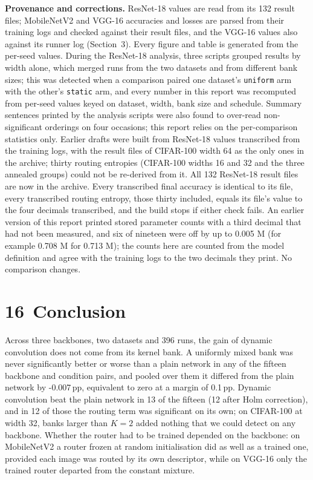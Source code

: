 \documentclass{article}
\begin{document}
\textbf{Provenance and corrections.}  ResNet-18 values are read from
its 132 result files; MobileNetV2 and VGG-16 accuracies and losses are
parsed from their training logs and checked against their result files,
and the VGG-16 values also against its runner log
(Section~3). Every figure and table is generated from the
per-seed values. During the ResNet-18 analysis, three scripts
grouped results by width alone, which merged runs from the two datasets and
from different bank sizes; this was detected when a comparison paired one
dataset's \texttt{uniform} arm with the other's \texttt{static} arm, and
every number in this report was recomputed from per-seed values keyed on
dataset, width, bank size and schedule. Summary sentences printed by the
analysis scripts were also found to over-read non-significant orderings on
four occasions; this report relies on the per-comparison statistics only.
Earlier drafts were built from ResNet-18 values transcribed from the
training logs, with the result files of CIFAR-100 width 64 as the only
ones in the archive; thirty routing entropies (CIFAR-100 widths 16 and 32
and the three annealed groups) could not be re-derived from it. All 132
ResNet-18 result files are now in the archive. Every transcribed final
accuracy is identical to its file, every transcribed routing entropy,
those thirty included, equals its file's value to the four decimals
transcribed, and the build stops if either check fails. An earlier version of this report printed stored
parameter counts with a third decimal that had not been measured, and six
of nineteen were off by up to 0.005 M (for example 0.708 M for
0.713 M); the counts here are counted from the model definition and
agree with the training logs to the two decimals they print. No comparison
changes.

\section*{16 Conclusion}

Across three backbones, two datasets and 396 runs, the gain of
dynamic convolution does not come from its kernel bank. A uniformly mixed
bank was never significantly better or worse than a plain network in any of
the fifteen backbone and condition pairs, and pooled over them it differed
from the plain network by -0.007\,pp, equivalent to zero at a margin
of 0.1\,pp. Dynamic convolution beat the plain network in
13 of the fifteen (12 after Holm correction), and in
12 of those the routing term was significant on its own; on CIFAR-100 at width 32, banks larger than $K=2$ added nothing that
we could detect on any backbone. Whether the router had to be trained
depended on the backbone: on MobileNetV2 a router frozen at random
initialisation did as well as a trained one, provided each image was
routed by its own descriptor, while on VGG-16 only the trained router
departed from the constant mixture.
\end{document}
